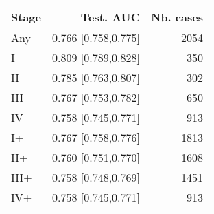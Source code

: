 \begin{table}[ht]
\centering
\begin{tabular}{lrr}
  \toprule
Stage & Test. AUC & Nb. cases \\ 
  \midrule
Any & 0.766 [0.758,0.775] & 2054 \\ 
   \addlinespace
I & 0.809 [0.789,0.828] & 350 \\ 
  II & 0.785 [0.763,0.807] & 302 \\ 
  III & 0.767 [0.753,0.782] & 650 \\ 
  IV & 0.758 [0.745,0.771] & 913 \\ 
   \addlinespace
I+ & 0.767 [0.758,0.776] & 1813 \\ 
  II+ & 0.760 [0.751,0.770] & 1608 \\ 
  III+ & 0.758 [0.748,0.769] & 1451 \\ 
  IV+ & 0.758 [0.745,0.771] & 913 \\ 
   \bottomrule
\end{tabular}
\end{table}

